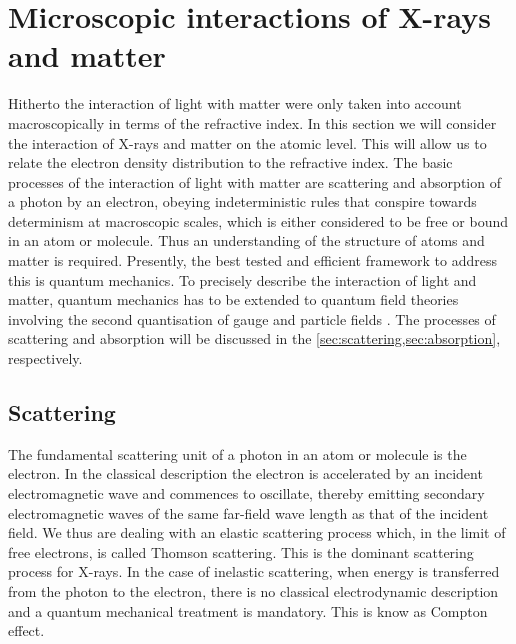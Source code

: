 \documentclass[
twoside,
openright,
titlepage,
numbers=noenddot,
headinclude,
fleqn,
a4paper,
footinclude=true,
cleardoublepage=empty,
abstractoff,
BCOR=5mm,
paper=a4,
fontsize=11pt,
british,ngerman,american,
]{scrreprt}
\begin{document}

\section{Microscopic interactions of X-rays and matter}
\label{sec:interaction}

Hitherto the interaction of light with matter were only taken into
account macroscopically in terms of the refractive index.  In this
section we will consider the interaction of X-rays and matter on the
atomic level.  This will allow us to relate the electron density
distribution to the refractive index.  The basic processes of the
interaction of light with matter are scattering and absorption of a
photon by an electron, obeying indeterministic rules that conspire
towards determinism at macroscopic scales, which is either considered
to be free or bound in an atom or molecule.  Thus an understanding of
the structure of atoms and matter is required.  Presently, the best
tested and efficient framework to address this is quantum mechanics.
To precisely describe the interaction of light and matter, quantum
mechanics has to be extended to quantum field theories involving the
second quantisation of gauge and particle fields \cite{Tomonaga1946,
  Schwinger1948a, Schwinger1948b, Feynman1949a, Feynman1949b,
  Feynman1950, Dyson1949}.  The processes of scattering and absorption
will be discussed in the \cref{sec:scattering,sec:absorption},
respectively.

\subsection{Scattering}
\label{sec:scattering}

The fundamental scattering unit of a photon in an atom or molecule is
the electron.  In the classical description the electron is
accelerated by an incident electromagnetic wave and commences to
oscillate, thereby emitting secondary electromagnetic waves of the
same far-field wave length as that of the incident field.  We thus are
dealing with an elastic scattering process which, in the limit of free
electrons, is called Thomson scattering.  This is the dominant
scattering process for X-rays.  In the case of inelastic scattering,
when energy is transferred from the photon to the electron, there is
no classical electrodynamic description and a quantum mechanical
treatment is mandatory.  This is know as Compton effect.
\end{document}
